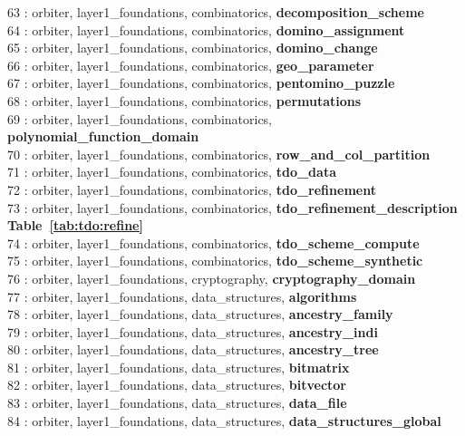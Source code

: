  63 : orbiter, layer1\_foundations, combinatorics, {\bf decomposition\_scheme}\\
 64 : orbiter, layer1\_foundations, combinatorics, {\bf domino\_assignment}\\
 65 : orbiter, layer1\_foundations, combinatorics, {\bf domino\_change}\\
 66 : orbiter, layer1\_foundations, combinatorics, {\bf geo\_parameter}\\
 67 : orbiter, layer1\_foundations, combinatorics, {\bf pentomino\_puzzle}\\
 68 : orbiter, layer1\_foundations, combinatorics, {\bf permutations}\\
 69 : orbiter, layer1\_foundations, combinatorics, {\bf polynomial\_function\_domain}\\
 70 : orbiter, layer1\_foundations, combinatorics, {\bf row\_and\_col\_partition}\\
 71 : orbiter, layer1\_foundations, combinatorics, {\bf tdo\_data}\\
 72 : orbiter, layer1\_foundations, combinatorics, {\bf tdo\_refinement}\\
 73 : orbiter, layer1\_foundations, combinatorics, {\bf tdo\_refinement\_description Table~\ref{tab:tdo:refine}}\\
 74 : orbiter, layer1\_foundations, combinatorics, {\bf tdo\_scheme\_compute}\\
 75 : orbiter, layer1\_foundations, combinatorics, {\bf tdo\_scheme\_synthetic}\\
 76 : orbiter, layer1\_foundations, cryptography, {\bf cryptography\_domain}\\
 77 : orbiter, layer1\_foundations, data\_structures, {\bf algorithms}\\
 78 : orbiter, layer1\_foundations, data\_structures, {\bf ancestry\_family}\\
 79 : orbiter, layer1\_foundations, data\_structures, {\bf ancestry\_indi}\\
 80 : orbiter, layer1\_foundations, data\_structures, {\bf ancestry\_tree}\\
 81 : orbiter, layer1\_foundations, data\_structures, {\bf bitmatrix}\\
 82 : orbiter, layer1\_foundations, data\_structures, {\bf bitvector}\\
 83 : orbiter, layer1\_foundations, data\_structures, {\bf data\_file}\\
 84 : orbiter, layer1\_foundations, data\_structures, {\bf data\_structures\_global}\\
